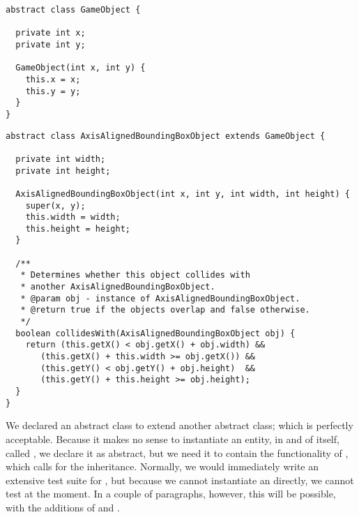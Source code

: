 \begin{lstlisting}[language=MyJava]
abstract class GameObject {
  
  private int x;
  private int y;

  GameObject(int x, int y) {
    this.x = x;
    this.y = y;
  }
}
\end{lstlisting}


\begin{lstlisting}[language=MyJava]
abstract class AxisAlignedBoundingBoxObject extends GameObject {
  
  private int width;
  private int height;

  AxisAlignedBoundingBoxObject(int x, int y, int width, int height) {
    super(x, y);
    this.width = width;
    this.height = height;
  }

  /**
   * Determines whether this object collides with 
   * another AxisAlignedBoundingBoxObject.
   * @param obj - instance of AxisAlignedBoundingBoxObject.
   * @return true if the objects overlap and false otherwise.
   */
  boolean collidesWith(AxisAlignedBoundingBoxObject obj) {
    return (this.getX() < obj.getX() + obj.width) &&
	   (this.getX() + this.width >= obj.getX()) &&
 	   (this.getY() < obj.getY() + obj.height)  &&
	   (this.getY() + this.height >= obj.height); 
  }
}
\end{lstlisting}

We declared an abstract class to extend another abstract class; which is perfectly acceptable. Because it makes no sense to instantiate an entity, in and of itself, called , we declare it as abstract, but we need it to contain the functionality of , which calls for the inheritance. Normally, we would immediately write an extensive test suite for , but because we cannot instantiate an  directly, we cannot test  at the moment. In a couple of paragraphs, however, this will be possible, with the additions of  and .

